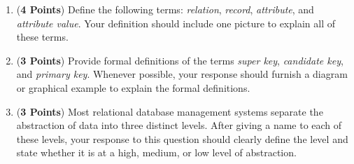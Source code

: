 \documentclass[12pt]{article}
\begin{document}
\begin{enumerate}
\begin{enumerate}

\item ({\bf 4 Points}) Define the following terms: {\em relation},
  {\em record}, {\em attribute}, and {\em attribute value}.  Your
  definition should include one picture to explain all of these terms.

\item ({\bf 3 Points}) Provide formal definitions of the terms {\em
  super key}, {\em candidate key}, and {\em primary key}.  Whenever
  possible, your response should furnish a diagram or graphical
  example to explain the formal definitions.




\item ({\bf 3 Points}) Most relational database management systems
  separate the abstraction of data into three distinct levels.  After
  giving a name to each of these levels, your response to this
  question should clearly define the level and state whether it is at
  a high, medium, or low level of abstraction.

\end{enumerate}


\end{enumerate}
\end{document}
